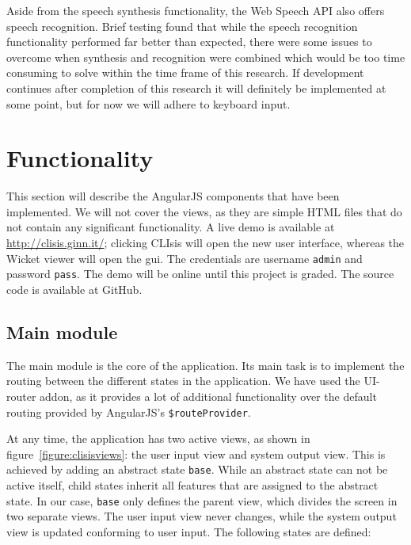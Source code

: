 Aside from the speech synthesis functionality, the Web Speech API also offers speech recognition. Brief testing found that while the speech recognition functionality performed far better than expected, there were some issues to overcome when synthesis and recognition were combined which would be too time consuming to solve within the time frame of this research. If development continues after completion of this research it will definitely be implemented at some point, but for now we will adhere to keyboard input.

\section{Functionality}
\label{section:functionality}
This section will describe the AngularJS components that have been implemented. We will not cover the views, as they are simple HTML files that do not contain any significant functionality. A live demo is available at \url{http://clisis.ginn.it/}; clicking CLIsis will open the new user interface, whereas the Wicket viewer will open the \acrshort{gui}. The credentials are username \texttt{admin} and password \texttt{pass}. The demo will be online until this project is graded.  The source code is available at GitHub\cite{sande54:online}.

\subsection{Main module}
\label{subsection:mainmodule}
The main module  is the core of the application. Its main task is to implement the routing between the different states in the application. We have used the UI-router addon\cite{angul39:online}, as it provides a lot of additional functionality over the default routing provided by AngularJS's \texttt{\$routeProvider}. 

At any time, the application has two active views, as shown in figure~\ref{figure:clisisviews}: the user input view and system output view. This is achieved by adding an abstract state \texttt{base}. While an abstract state can not be active itself, child states inherit all features that are assigned to the abstract state. In our case, \texttt{base} only defines the parent view, which divides the screen in two separate views. The user input view never changes, while the system output view is updated conforming to user input. The following states are defined:

